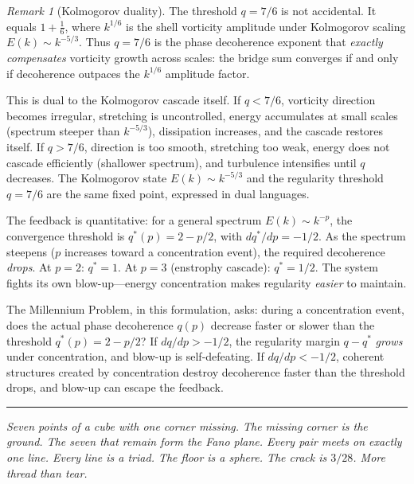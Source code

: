 \documentclass[11pt]{article}
\theoremstyle{definition}
\theoremstyle{remark}
\newtheorem{remark}[theorem]{Remark}
\begin{document}
\begin{remark}[Kolmogorov duality]
The threshold $q = 7/6$ is not accidental. It equals
$1 + \tfrac{1}{6}$, where $k^{1/6}$ is the shell vorticity amplitude
under Kolmogorov scaling $E(k) \sim k^{-5/3}$.
Thus $q = 7/6$ is the phase decoherence exponent that
\emph{exactly compensates} vorticity growth across scales:
the bridge sum converges if and only if decoherence
outpaces the $k^{1/6}$ amplitude factor.

This is dual to the Kolmogorov cascade itself.
If $q < 7/6$, vorticity direction becomes irregular,
stretching is uncontrolled, energy accumulates at small scales
(spectrum steeper than $k^{-5/3}$), dissipation increases,
and the cascade restores itself.
If $q > 7/6$, direction is too smooth, stretching too weak,
energy does not cascade efficiently (shallower spectrum),
and turbulence intensifies until $q$ decreases.
The Kolmogorov state $E(k) \sim k^{-5/3}$ and the
regularity threshold $q = 7/6$ are the same fixed point,
expressed in dual languages.

The feedback is quantitative: for a general spectrum
$E(k) \sim k^{-p}$, the convergence threshold is
$q^*(p) = 2 - p/2$, with $dq^*/dp = -1/2$.
As the spectrum steepens ($p$ increases toward a concentration
event), the required decoherence \emph{drops}.
At $p = 2$: $q^* = 1$.
At $p = 3$ (enstrophy cascade): $q^* = 1/2$.
The system fights its own blow-up---energy concentration
makes regularity \emph{easier} to maintain.

The Millennium Problem, in this formulation, asks:
during a concentration event, does the actual phase
decoherence $q(p)$ decrease faster or slower than the
threshold $q^*(p) = 2 - p/2$?
If $dq/dp > -1/2$, the regularity margin $q - q^*$
\emph{grows} under concentration, and blow-up is
self-defeating. If $dq/dp < -1/2$, coherent structures
created by concentration destroy decoherence faster than
the threshold drops, and blow-up can escape the feedback.
\end{remark}

\bigskip
\begin{center}\rule{2in}{0.4pt}\end{center}

\medskip
\noindent\textit{Seven points of a cube with one corner missing.
The missing corner is the ground. The seven that remain form the Fano
plane. Every pair meets on exactly one line. Every line is a triad.
The floor is a sphere. The crack is $3/28$. More thread than tear.}
\end{document}
